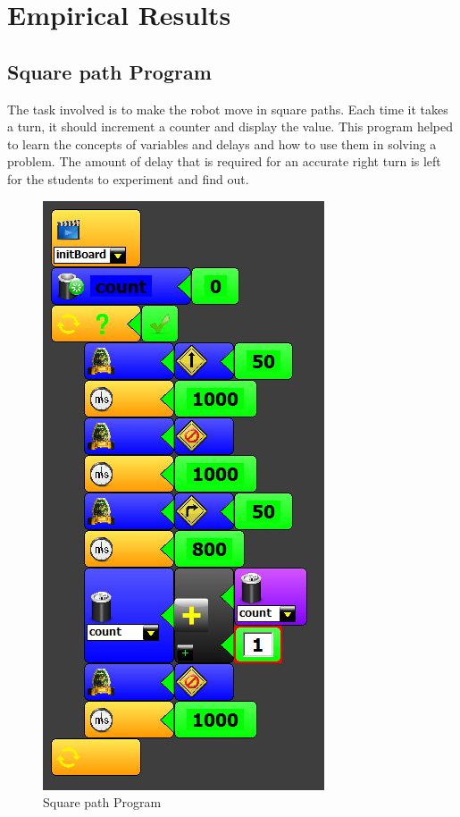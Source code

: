 \documentclass[conference]{IEEEtran}
\begin{document}
\section{Empirical Results}

\subsection{Square path Program}

The task involved is to make the robot move in square paths. Each time it takes a turn, it should increment a counter and display the value. This program helped to learn the concepts of variables and delays and how to use them in solving a problem. The amount of delay that is required for an accurate right turn is left for the students to experiment and find out.

\begin{figure}[h]
\centering
\includegraphics[scale=0.5]{Fig_13.png}
\caption{Square path Program}
\end{figure}
\end{document}
